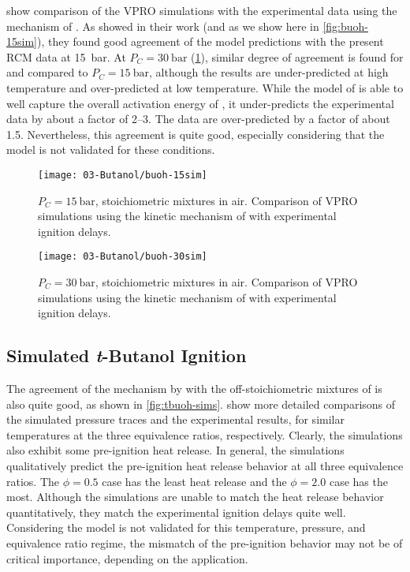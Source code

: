 \documentclass[../main.tex]{subfiles}
\begin{document}
 show comparison of the
VPRO simulations with the experimental data using the mechanism of
\textcite{Sarathy2012}. As \textcite{Sarathy2012} showed in their work (and as
we show here in \cref{fig:buoh-15sim}), they found good agreement of the
model predictions with the present RCM data at \SI{15}{\bar}. At $P_C=\SI{30}{\bar}$
(\cref{fig:buoh-30sim}), similar degree of agreement is found for
\tBuOH{} and \sBuOH{} compared to $P_C=\SI{15}{\bar}$, although
the \sBuOH{} results are under-predicted at high temperature and
over-predicted at low temperature. While the model of \textcite{Sarathy2012} is
able to well capture the overall activation energy of \iBuOH{}, it
under-predicts the experimental data by about a factor of \numrange{2}{3}. The
\nBuOH{} data are over-predicted by a factor of about \num{1.5}.
Nevertheless, this agreement is quite good, especially considering that the
model is not validated for these conditions.

\begin{figure}
    \begin{floatrow}
    \ffigbox
        {\texttt{[image: 03-Butanol/buoh-15sim]}}
        {\caption{$P_C=\SI{15}{\bar}$, stoichiometric mixtures in air. Comparison of
            VPRO simulations using the kinetic mechanism of
            \textcite{Sarathy2012} with experimental ignition delays.}
        \label{fig:buoh-15sim}}
    \ffigbox
        {\texttt{[image: 03-Butanol/buoh-30sim]}}
        {\caption{$P_C=\SI{30}{\bar}$, stoichiometric mixtures in air. Comparison of
            VPRO simulations using the kinetic mechanism of
            \textcite{Sarathy2012} with experimental ignition delays.}
        \label{fig:buoh-30sim}}
    \end{floatrow}
\end{figure}

\subsection{Simulated \textit{t}-Butanol Ignition}

The agreement of the mechanism by \textcite{Sarathy2012} with the
off-stoichiometric mixtures of \tBuOH{} is also quite good, as shown
in \cref{fig:tbuoh-sims}.  show more detailed comparisons
of the simulated pressure traces and the experimental results, for similar
temperatures at the three equivalence ratios, respectively. Clearly, the
simulations also exhibit some pre-ignition heat release. In general, the
simulations qualitatively predict the pre-ignition heat release behavior at all
three equivalence ratios. The $\phi=\num{0.5}$ case has the least heat release and
the $\phi=\num{2.0}$ case has the most. Although the simulations are unable to match
the heat release behavior quantitatively, they match the experimental ignition
delays quite well. Considering the model is not validated for this temperature,
pressure, and equivalence ratio regime, the mismatch of the pre-ignition
behavior may not be of critical importance, depending on the application.
\end{document}
